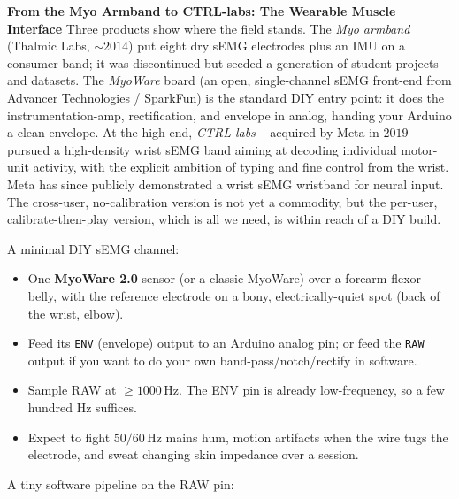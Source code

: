 \begin{applicationbox}
\textbf{From the Myo Armband to CTRL-labs: The Wearable Muscle Interface}
Three products show where the field stands. The \emph{Myo armband}
(Thalmic Labs, $\sim 2014$) put eight dry sEMG electrodes plus an IMU on a consumer
band; it was discontinued but seeded a generation of student projects and datasets.
The \emph{MyoWare} board (an open, single-channel sEMG front-end from Advancer
Technologies / SparkFun) is the standard DIY entry point: it does the
instrumentation-amp, rectification, and envelope in analog, handing your Arduino a
clean envelope. At the high end, \emph{CTRL-labs} -- acquired by Meta in $2019$ --
pursued a high-density wrist sEMG band aiming at decoding individual motor-unit
activity, with the explicit ambition of typing and fine control from the wrist. Meta
has since publicly demonstrated a wrist sEMG wristband for neural input. The
cross-user, no-calibration version is not yet a commodity,
but the per-user, calibrate-then-play version, which is all we need, is
within reach of a DIY build.
\end{applicationbox}

\begin{buildbox}
A minimal DIY sEMG channel:
\begin{itemize}
\item One \textbf{MyoWare 2.0} sensor (or a classic MyoWare) over a forearm flexor
belly, with the reference electrode on a bony, electrically-quiet spot (back of the
wrist, elbow).
\item Feed its \texttt{ENV} (envelope) output to an Arduino analog pin; or feed the
\texttt{RAW} output if you want to do your own band-pass/notch/rectify in software.
\item Sample RAW at $\geq 1000$\,Hz. The ENV pin is already low-frequency, so a few
hundred Hz suffices.
\item Expect to fight $50/60$\,Hz mains hum, motion artifacts when the wire tugs the
electrode, and sweat changing skin impedance over a session.
\end{itemize}
A tiny software pipeline on the RAW pin:
\end{buildbox}


